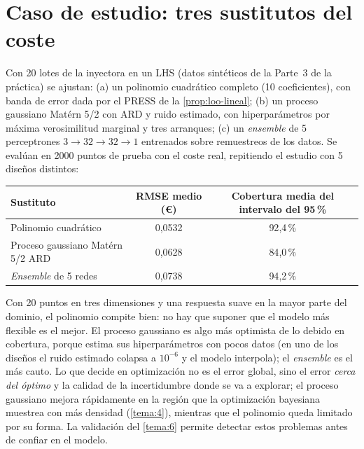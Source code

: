 \section{Caso de estudio: tres sustitutos del coste}

\begin{ejemplo}\label{ej:sustitutos}
Con 20 lotes de la inyectora en un LHS (datos sintéticos de la Parte~3 de la práctica) se ajustan: (a) un polinomio cuadrático completo (10 coeficientes), con banda de error dada por el PRESS de la \cref{prop:loo-lineal}; (b) un proceso gaussiano Matérn 5/2 con ARD y ruido estimado, con hiperparámetros por máxima verosimilitud marginal y tres arranques; (c) un \emph{ensemble} de 5 perceptrones $3\to32\to32\to1$ entrenados sobre remuestreos de los datos. Se evalúan en 2000 puntos de prueba con el coste real, repitiendo el estudio con 5 diseños distintos:
\begin{center}\small
\begin{tabular}{@{}lcc@{}}
\toprule
Sustituto & RMSE medio (€) & Cobertura media del intervalo del 95\,\% \\
\midrule
Polinomio cuadrático & 0{,}0532 & 92{,}4\,\% \\
Proceso gaussiano Matérn 5/2 ARD & 0{,}0628 & 84{,}0\,\% \\
\emph{Ensemble} de 5 redes & 0{,}0738 & 94{,}2\,\% \\
\bottomrule
\end{tabular}
\end{center}
Con 20 puntos en tres dimensiones y una respuesta suave en la mayor parte del dominio, el polinomio compite bien: no hay que suponer que el modelo más flexible es el mejor. El proceso gaussiano es algo más optimista de lo debido en cobertura, porque estima sus hiperparámetros con pocos datos (en uno de los diseños el ruido estimado colapsa a $10^{-6}$ y el modelo interpola); el \emph{ensemble} es el más cauto. Lo que decide en optimización no es el error global, sino el error \emph{cerca del óptimo} y la calidad de la incertidumbre donde se va a explorar; el proceso gaussiano mejora rápidamente en la región que la optimización bayesiana muestrea con más densidad (\cref{tema:4}), mientras que el polinomio queda limitado por su forma. La validación del \cref{tema:6} permite detectar estos problemas antes de confiar en el modelo.
\end{ejemplo}

